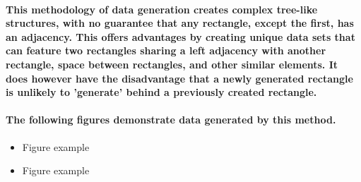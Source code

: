 \documentclass{Assignment}
\begin{document}
            \paragraph{ This methodology of data generation creates complex tree-like structures, with no guarantee that any rectangle, except the first, has an adjacency. This offers advantages by creating unique data sets that can feature two rectangles sharing a left adjacency with another rectangle, space between rectangles, and other similar elements. It does however have the disadvantage that a newly generated rectangle is unlikely to 'generate' behind a previously created rectangle.}

            \paragraph{The following figures demonstrate data generated by this method.}
            \begin{itemize}
                \item Figure example
                \item Figure example
            \end{itemize}
\end{document}
